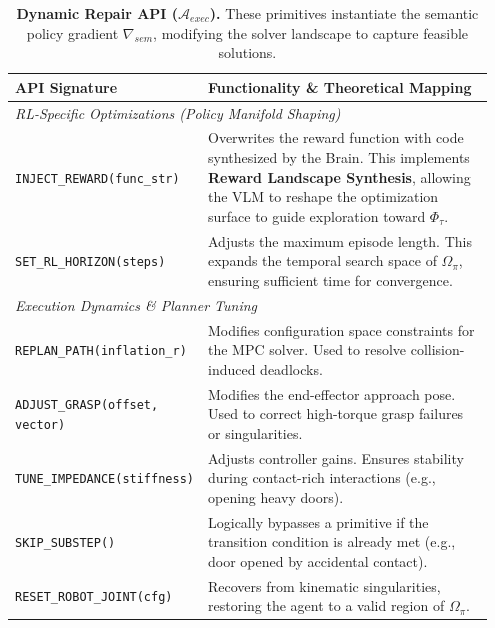 \documentclass{article}
\theoremstyle{plain}
\theoremstyle{definition}
\theoremstyle{remark}
\begin{document}
\begin{table}[h]
\caption{\textbf{Dynamic Repair API ($\mathcal{A}_{exec}$).} These primitives instantiate the semantic policy gradient $\nabla_{sem}$, modifying the solver landscape to capture feasible solutions.}
\label{tab:dynamic_api}
\begin{center}
\begin{small}
\begin{tabular}{p{0.35\linewidth} p{0.6\linewidth}}
\toprule
\textbf{API Signature} & \textbf{Functionality \& Theoretical Mapping} \\
\midrule
\multicolumn{2}{l}{\textit{RL-Specific Optimizations (Policy Manifold Shaping)}} \\
\texttt{INJECT\_REWARD(func\_str)} & Overwrites the reward function with code synthesized by the Brain. This implements \textbf{Reward Landscape Synthesis}, allowing the VLM to reshape the optimization surface to guide exploration toward $\Phi_\tau$. \\
\texttt{SET\_RL\_HORIZON(steps)} & Adjusts the maximum episode length. This expands the temporal search space of $\Omega_\pi$, ensuring sufficient time for convergence. \\
\midrule
\multicolumn{2}{l}{\textit{Execution Dynamics \& Planner Tuning}} \\
\texttt{REPLAN\_PATH(inflation\_r)} & Modifies configuration space constraints for the MPC solver. Used to resolve collision-induced deadlocks. \\
\texttt{ADJUST\_GRASP(offset, vector)} & Modifies the end-effector approach pose. Used to correct high-torque grasp failures or singularities. \\
\texttt{TUNE\_IMPEDANCE(stiffness)} & Adjusts controller gains. Ensures stability during contact-rich interactions (e.g., opening heavy doors). \\
\texttt{SKIP\_SUBSTEP()} & Logically bypasses a primitive if the transition condition is already met (e.g., door opened by accidental contact). \\
\texttt{RESET\_ROBOT\_JOINT(cfg)} & Recovers from kinematic singularities, restoring the agent to a valid region of $\Omega_\pi$. \\
\bottomrule
\end{tabular}
\end{small}
\end{center}
\end{table}

\end{document}
